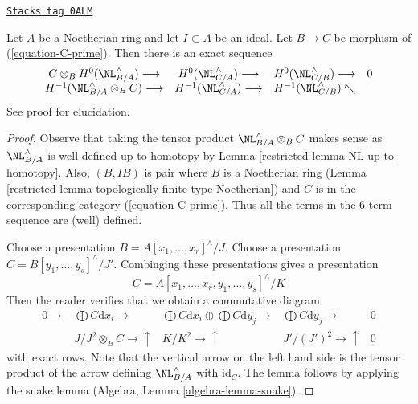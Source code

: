 \begin{lemma}
\label{restricted-lemma-exact-sequence-NL}
\href{https://stacks.math.columbia.edu/tag/0ALM}{\texttt{Stacks tag 0ALM}}

Let $A$ be a Noetherian ring and let $I \subset A$ be an ideal.
Let $B \to C$ be morphism of (\ref{equation-C-prime}). Then
there is an exact sequence
$$
\begin{array}{cccc}C \otimes_B H^0(\NL_{B/A}^\wedge) \longrightarrow & H^0(\NL_{C/A}^\wedge) \longrightarrow & H^0(\NL_{C/B}^\wedge) \longrightarrow & 0 \\ H^{-1}(\NL_{B/A}^\wedge \otimes_B C) \longrightarrow & H^{-1}(\NL_{C/A}^\wedge) \longrightarrow & H^{-1}(\NL_{C/B}^\wedge) \nwarrow & \end{array}
$$
See proof for elucidation.
\end{lemma}

\begin{proof}

Observe that taking the tensor product $\NL_{B/A}^\wedge \otimes_B C$
makes sense as $\NL_{B/A}^\wedge$ is well defined up to homotopy by
Lemma \ref{restricted-lemma-NL-up-to-homotopy}.
Also, $(B, IB)$ is pair where $B$ is a Noetherian ring
(Lemma \ref{restricted-lemma-topologically-finite-type-Noetherian})
and $C$ is in the corresponding category (\ref{equation-C-prime}).
Thus all the terms in the $6$-term sequence are (well) defined.

\medskip\noindent
Choose a presentation $B = A[x_1, \ldots, x_r]^\wedge/J$.
Choose a presentation $C = B[y_1, \ldots, y_s]^\wedge/J'$.
Combinging these presentations gives a presentation
$$
C = A[x_1, \ldots, x_r, y_1, \ldots, y_s]^\wedge/K
$$
Then the reader verifies that we obtain a commutative diagram
$$
\begin{array}{ccccc}0 \longrightarrow & \bigoplus C \text{d}x_i \longrightarrow & \bigoplus C \text{d}x_i \oplus \bigoplus C \text{d}y_j \longrightarrow & \bigoplus C \text{d}y_j \longrightarrow & 0 \\  & J/J^2 \otimes_B C \longrightarrow\uparrow & K/K^2 \longrightarrow\uparrow & J'/(J')^2 \longrightarrow\uparrow & 0\end{array}
$$
with exact rows. Note that the vertical arrow on the left hand side
is the tensor product of the arrow defining $\NL_{B/A}^\wedge$ with
$\text{id}_C$. The lemma follows by applying the snake lemma
(Algebra, Lemma \ref{algebra-lemma-snake}).
\end{proof}

